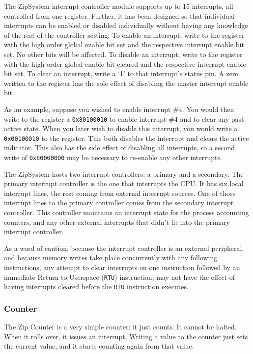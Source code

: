 \documentclass{gqtekspec}
\begin{document}
The ZipSystem interrupt controller module supports up to 15 interrupts, all
controlled from one register.  Further, it has been designed so that individual
interrupts can be enabled or disabled individually without having any knowledge
of the rest of the controller setting.  To enable an interrupt, write to the
register with the high order global enable bit set and the respective interrupt
enable bit set.  No other bits will be affected.  To disable an interrupt,
write to the register with the high order global enable bit cleared and the
respective interrupt enable bit set.  To clear an interrupt, write a `1' to
that interrupt's status pin.  A zero written to the register has the sole
effect of disabling the master interrupt enable bit.

As an example, suppose you wished to enable interrupt \#4.  You would then
write to the register a {\tt 0x80100010} to enable interrupt \#4 and to clear
any past active state.  When you later wish to disable this interrupt, you would
write a {\tt 0x00100010} to the register.  This both disables the
interrupt and clears the active indicator.  This also has the side effect of
disabling all interrupts, so a second write of {\tt 0x80000000} may be necessary
to re-enable any other interrupts.

The ZipSystem hosts two interrupt controllers: a primary and a secondary.  The
primary interrupt controller is the one that interrupts the CPU.  It has
six local interrupt lines, the rest coming from external interrupt sources.
One of those interrupt lines to the primary controller comes from the secondary
interrupt controller.  This controller maintains an interrupt state for the
process accounting counters, and any other external interrupts that didn't fit
into the primary interrupt controller.

As a word of caution, because the interrupt controller is an external
peripheral, and because memory writes take place concurrently with any following
instructions, any attempt to clear interrupts on one instruction followed by
an immediate Return to Userspace ({\tt RTU}) instruction, may not have the
effect of having interrupts cleared before the {\tt RTU} instruction executes.

\subsubsection{Counter}

The Zip Counter is a very simple counter: it just counts.  It cannot be
halted.  When it rolls over, it issues an interrupt.  Writing a value to the
counter just sets the current value, and it starts counting again from that
value.
\end{document}
